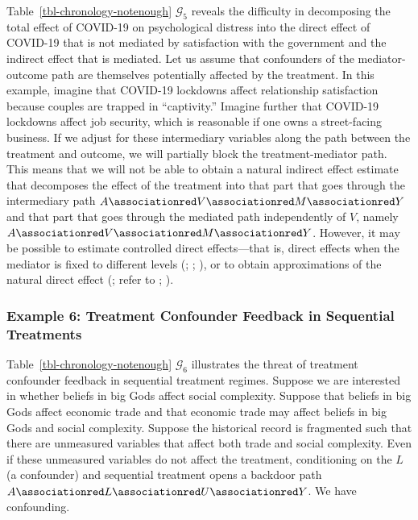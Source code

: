 \documentclass[
  single column]{article}
\begin{document}
Table~\ref{tbl-chronology-notenough} \(\mathcal{G}_5\) reveals the
difficulty in decomposing the total effect of COVID-19 on psychological
distress into the direct effect of COVID-19 that is not mediated by
satisfaction with the government and the indirect effect that is
mediated. Let us assume that confounders of the mediator-outcome path
are themselves potentially affected by the treatment. In this example,
imagine that COVID-19 lockdowns affect relationship satisfaction because
couples are trapped in ``captivity.'' Imagine further that COVID-19
lockdowns affect job security, which is reasonable if one owns a
street-facing business. If we adjust for these intermediary variables
along the path between the treatment and outcome, we will partially
block the treatment-mediator path. This means that we will not be able
to obtain a natural indirect effect estimate that decomposes the effect
of the treatment into that part that goes through the intermediary path
\(A \associationred V \associationred M \associationred Y\) and that
part that goes through the mediated path independently of \(V\), namely
\(A \associationred V \associationred M \associationred Y\). However, it
may be possible to estimate controlled direct effects---that is, direct
effects when the mediator is fixed to different levels
(;
;
), or to obtain
approximations of the natural direct effect
(; refer to
;
).

\subsubsection{Example 6: Treatment Confounder Feedback in Sequential
Treatments}\label{example-6-treatment-confounder-feedback-in-sequential-treatments}

Table~\ref{tbl-chronology-notenough} \(\mathcal{G}_6\) illustrates the
threat of treatment confounder feedback in sequential treatment regimes.
Suppose we are interested in whether beliefs in big Gods affect social
complexity. Suppose that beliefs in big Gods affect economic trade and
that economic trade may affect beliefs in big Gods and social
complexity. Suppose the historical record is fragmented such that there
are unmeasured variables that affect both trade and social complexity.
Even if these unmeasured variables do not affect the treatment,
conditioning on the \(L\) (a confounder) and sequential treatment opens
a backdoor path
\(A \associationred L \associationred U \associationred Y\). We have
confounding.
\end{document}

